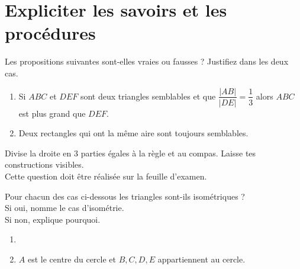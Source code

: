 \section*{Expliciter les savoirs et les procédures}

\begin{exercise}[points=2]
    Les propositions suivantes sont-elles vraies ou fausses ? Justifiez dans les deux cas.
    \begin{enumerate}
        \item Si $ABC$ et $DEF$ sont deux triangles semblables et que $\dfrac{|AB|}{|DE|}=\dfrac{1}{3}$ alors $ABC$ est plus grand que $DEF$.
        \item Deux rectangles qui ont la même aire sont toujours semblables.
    \end{enumerate}
\end{exercise}

\begin{exercise}[points=1]
    Divise la droite en 3 parties égales à la règle et au compas. Laisse tes constructions visibles.\\
    Cette question doit être réalisée sur la feuille d'examen.
    \begin{center}
        
    \end{center}
\end{exercise}
\newpage

\begin{exercise}[points=2]
    Pour chacun des cas ci-dessous les triangles sont-ils isométriques ?\\
    Si oui, nomme le cas d'isométrie.\\
    Si non, explique pourquoi.\\
    \begin{enumerate}[cols=2]
        \item 
        \item $A$ est le centre du cercle et $B,C,D,E$ appartiennent au cercle.\\
    \end{enumerate}
\end{exercise}
